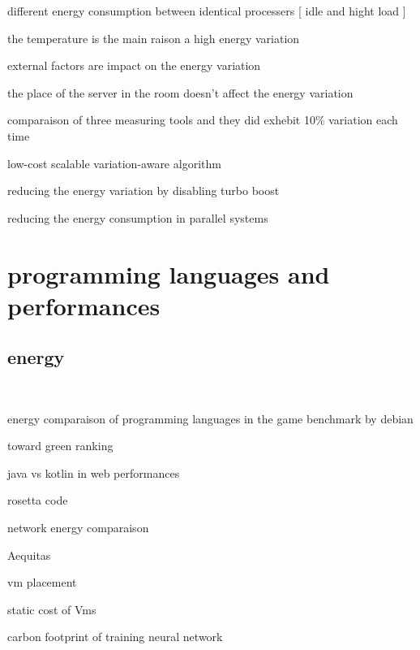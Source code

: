 different energy consumption between identical processers [ idle and hight load ]\cite{von2016variations}

the temperature is the main raison a high energy variation \cite{wang2018potential}

external factors are impact on the energy variation \cite{mukherjee2009spatio}

the place of the server in the room doesn't affect the energy variation \cite{diouri2013your}

comparaison of three measuring tools and they did exhebit 10\% variation each time \cite{inadomi2015analyzing}

low-cost scalable variation-aware algorithm \cite{inadomi2015analyzing}

reducing the energy variation by disabling turbo boost \cite{acun2016variation}

reducing the energy consumption in parallel systems \cite{chasapis2016runtime}

\cite{marathe2017empirical}



\section{programming languages and performances}\label{section:soa_optimization}
\subsection{energy}\


energy comparaison of programming languages in the game benchmark by debian \cite{pereira2017energy}

toward green ranking \cite{couto2017towards}

java vs kotlin in web performances \cite{bujnowski2020java}

rosetta code \cite{nanz2015comparative} \cite{mirowski2020rosetta}

network energy comparaison \cite{balasubramanian2009energy}

Aequitas \cite{ribic2016aequitas}

vm placement \cite{mishra2018energy}

\citeauthor{mishra2018energy}

static cost of Vms \cite{kurpicz2016much}



carbon footprint of training neural network \cite{strubell2019energy}

